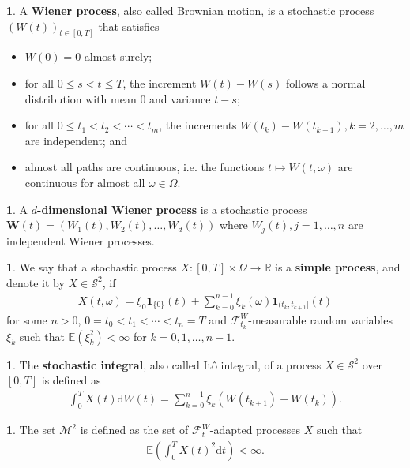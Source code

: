 \documentclass[english]{article}
\numberwithin{equation}{section}
\numberwithin{figure}{section}
\theoremstyle{bolddescit}
\theoremstyle{definition}
\newtheorem{definition}[theorem]{\protect\definitionname}
\theoremstyle{definition}
\theoremstyle{plain}
\theoremstyle{plain}
\theoremstyle{bolddesc}
\theoremstyle{plain}
\theoremstyle{remark}
\providecommand{\definitionname}{Definition}
\begin{document}
\begin{definition}
  A \textbf{Wiener process}, also called Brownian motion, is a stochastic process $(W(t))_{t \in [0,T]}$ that satisfies
  \begin{itemize}
    \item $W(0) = 0$ almost surely;
    \item for all $0 \le s < t \le T$, the increment $W(t) - W(s)$ follows a normal distribution with mean 0 and variance $t - s$;
    \item for all $0 \le t_1 < t_2 < \cdots < t_m$, the increments $W(t_k) - W(t_{k-1}), k=2,\ldots,m$ are independent; and
    \item almost all paths are continuous, i.e. the functions $t \mapsto W(t,\omega)$ are continuous for almost all $\omega \in \Omega$.
  \end{itemize}
\end{definition}

\begin{definition}
  A \textbf{$d$-dimensional Wiener process} is a stochastic process $\mathbf{W}(t) = (W_1(t), W_2(t), \ldots, W_d(t))$ where $W_j(t), j=1,\ldots,n$ are independent Wiener processes.
\end{definition}

\begin{definition}
  We say that a stochastic process $X : [0,T] \times \Omega \to \mathbb{R}$ is a \textbf{simple process}, and denote it by $X \in \mathcal{S}^2$, if
  \begin{align*}
    X(t,\omega) = \xi_0 \mathbf{1}_{\{0\}}(t) + \sum_{k=0}^{n-1} \xi_k(\omega) \mathbf{1}_{(t_k,t_{k+1}]}(t)
  \end{align*}
  for some $n > 0$, $0 = t_0 < t_1 < \cdots < t_n = T$ and $\mathcal{F}^W_{t_k}$-measurable random variables $\xi_k$ such that $\mathbb{E}(\xi_k^2) < \infty$ for $k = 0,1,\ldots,n-1$.
\end{definition}

\begin{definition}
  The \textbf{stochastic integral}, also called It\^o integral, of a process $X \in \mathcal{S}^2$ over $[0,T]$ is defined as
  \begin{align*}
    \int_0^T X(t) \mathrm{d}W(t) = \sum_{k=0}^{n-1} \xi_k (W(t_{k+1}) - W(t_k)).
  \end{align*}
\end{definition}

\begin{definition}
  The set $\mathcal{M}^2$ is defined as the set of $\mathcal{F}^W_t$-adapted processes $X$ such that
  \begin{align*}
    \mathbb{E}\left(\int_0^T X(t)^2 \mathrm{d}t \right) < \infty.
  \end{align*}
\end{definition}
\end{document}
